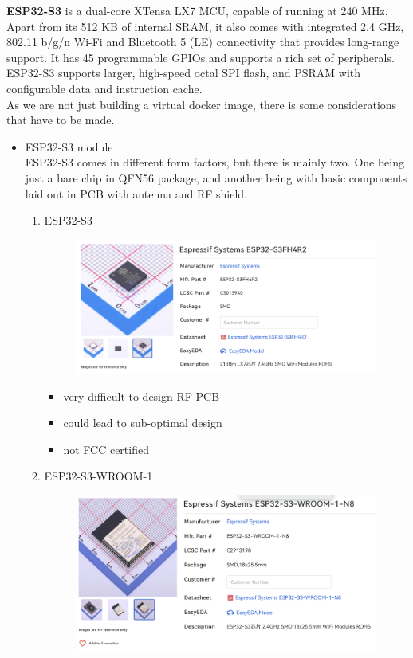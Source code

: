 \documentclass[conference]{IEEEtran}
\begin{document}
\textbf{ESP32-S3} is a dual-core XTensa LX7 MCU, capable of running at 240 MHz. Apart from its 512 KB of internal SRAM, it also comes with integrated 2.4 GHz, 802.11 b/g/n Wi-Fi and Bluetooth 5 (LE) connectivity that provides long-range support. It has 45 programmable GPIOs and supports a rich set of peripherals. ESP32-S3 supports larger, high-speed octal SPI flash, and PSRAM with configurable data and instruction cache.\\
As we are not just building a virtual docker image, there is some considerations that have to be made.\\

\begin{itemize}
\item ESP32-S3 module\\
ESP32-S3 comes in different form factors, but there is mainly two. One being just a bare chip in QFN56 package, and another being with basic components laid out in PCB with antenna and RF shield. \\
\begin{enumerate}[label=\arabic*.]
\item ESP32-S3
\begin{figure}[H]\centering \includegraphics[scale=0.25]{images/esp32-s3.png}\end{figure}
\begin{itemize}
\item very difficult to design RF PCB\\
\item could lead to sub-optimal design\\
\item not FCC certified\\
\end{itemize}
\item ESP32-S3-WROOM-1
\begin{figure}[H]\centering \includegraphics[scale=0.25]{images/esp32-s3-wroom-1.png}\end{figure}

\end{enumerate}
\end{itemize}
\end{document}
